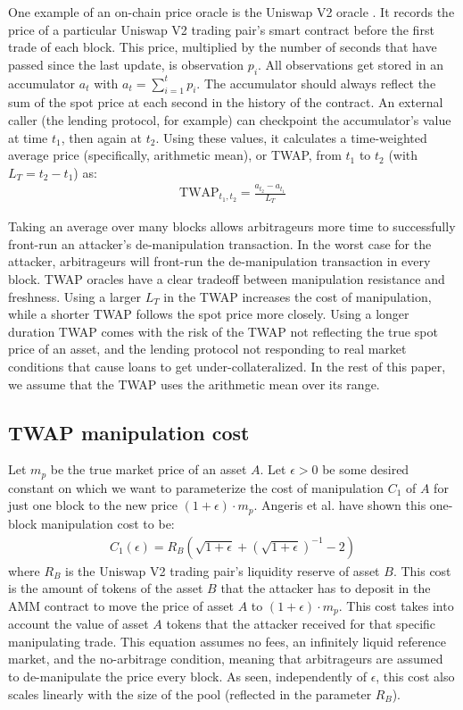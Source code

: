 One example of an on-chain price oracle is the Uniswap V2 oracle \cite{Adams2020UniV2}. It records the price of a particular Uniswap V2 trading pair's smart contract before the first trade of each block. This price, multiplied by the number of seconds that have passed since the last update, is observation $p_i$. All observations get stored in an accumulator $a_t$ with $a_t = \sum_{i=1}^{t}p_i$. The accumulator should always reflect the sum of the spot price at each second in the history of the contract.
An external caller (the lending protocol, for example) can checkpoint the accumulator's value at time $t_1$, then again at $t_2$. Using these values, it calculates a time-weighted average price (specifically, arithmetic mean), or TWAP, from $t_1$ to $t_2$ (with $L_T = t_2 - t_1$) as:
\begin{align*}
    \text{TWAP}_{t_1,t_2} = \frac{a_{t_2} - a_{t_1}}{L_T} 
\end{align*}

Taking an average over many blocks allows arbitrageurs more time to successfully front-run an attacker's de-manipulation transaction. In the worst case for the attacker, arbitrageurs will front-run the de-manipulation transaction in every block. TWAP oracles have a clear tradeoff between manipulation resistance and freshness. Using a larger $L_T$ in the TWAP increases the cost of manipulation, while a shorter TWAP follows the spot price more closely. Using a longer duration TWAP comes with the risk of the TWAP not reflecting the true spot price of an asset, and the lending protocol not responding to real market conditions that cause loans to get under-collateralized. In the rest of this paper, we assume that the TWAP uses the arithmetic mean over its range. 

\subsection{TWAP manipulation cost}
Let $m_p$ be the true market price of an asset $A$. Let $\epsilon > 0$ be some desired constant on which we want to parameterize the cost of manipulation $C_1$ of $A$ for just one block to the new price $(1+\epsilon)\cdot m_p$. Angeris et al. \cite{angeris2019uniswap} have shown this one-block manipulation cost to be:
\begin{align}
    C_1(\epsilon) = R_B(\sqrt{1+\epsilon} + (\sqrt{1+\epsilon})^{-1} -2)
    \label{AngerisCostBound}
\end{align}
where $R_B$ is the Uniswap V2 trading pair's liquidity reserve of asset $B$. This cost is the amount of tokens of the asset $B$ that the attacker has to deposit in the AMM contract to move the price of asset $A$ to $(1+\epsilon)\cdot m_p$. This cost takes into account the value of asset $A$ tokens that the attacker received for that specific manipulating trade. This equation assumes no fees, an infinitely liquid reference market, and the no-arbitrage condition, meaning that arbitrageurs are assumed to de-manipulate the price every block. As seen, independently of $\epsilon$, this cost also scales linearly with the size of the pool (reflected in the parameter $R_B$).


